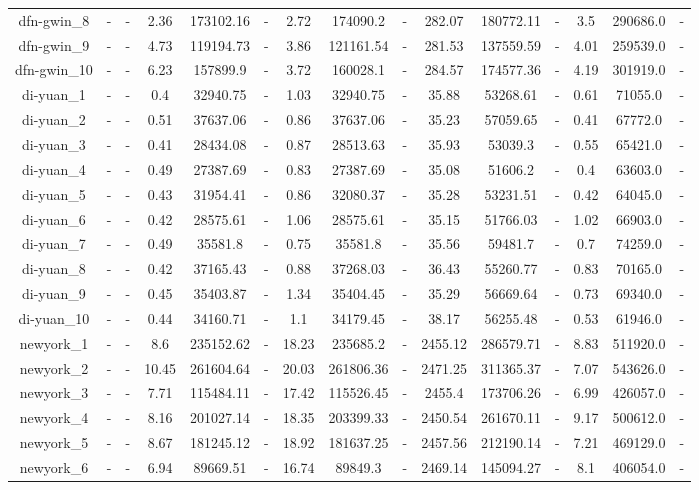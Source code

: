 \documentclass[main.tex]{subfiles}
\begin{document}
\begin{landscape}
\begin{table}[h]
\begin{tabular}{c|cc|ccc|ccc|ccc|ccc}
	\hline
	dfn-gwin\_8 &- &- &2.36 &173102.16 &- &2.72 &174090.2 &- &282.07 &180772.11 &- &3.5 &290686.0 &-\\
	dfn-gwin\_9 &- &- &4.73 &119194.73 &- &3.86 &121161.54 &- &281.53 &137559.59 &- &4.01 &259539.0 &-\\
	dfn-gwin\_10 &- &- &6.23 &157899.9 &- &3.72 &160028.1 &- &284.57 &174577.36 &- &4.19 &301919.0 &-\\
	di-yuan\_1 &- &- &0.4 &32940.75 &- &1.03 &32940.75 &- &35.88 &53268.61 &- &0.61 &71055.0 &-\\
	di-yuan\_2 &- &- &0.51 &37637.06 &- &0.86 &37637.06 &- &35.23 &57059.65 &- &0.41 &67772.0 &-\\
	di-yuan\_3 &- &- &0.41 &28434.08 &- &0.87 &28513.63 &- &35.93 &53039.3 &- &0.55 &65421.0 &-\\
	di-yuan\_4 &- &- &0.49 &27387.69 &- &0.83 &27387.69 &- &35.08 &51606.2 &- &0.4 &63603.0 &-\\
	di-yuan\_5 &- &- &0.43 &31954.41 &- &0.86 &32080.37 &- &35.28 &53231.51 &- &0.42 &64045.0 &-\\
	di-yuan\_6 &- &- &0.42 &28575.61 &- &1.06 &28575.61 &- &35.15 &51766.03 &- &1.02 &66903.0 &-\\
	di-yuan\_7 &- &- &0.49 &35581.8 &- &0.75 &35581.8 &- &35.56 &59481.7 &- &0.7 &74259.0 &-\\
	di-yuan\_8 &- &- &0.42 &37165.43 &- &0.88 &37268.03 &- &36.43 &55260.77 &- &0.83 &70165.0 &-\\
	di-yuan\_9 &- &- &0.45 &35403.87 &- &1.34 &35404.45 &- &35.29 &56669.64 &- &0.73 &69340.0 &-\\
	di-yuan\_10 &- &- &0.44 &34160.71 &- &1.1 &34179.45 &- &38.17 &56255.48 &- &0.53 &61946.0 &-\\
	newyork\_1 &- &- &8.6 &235152.62 &- &18.23 &235685.2 &- &2455.12 &286579.71 &- &8.83 &511920.0 &-\\
	newyork\_2 &- &- &10.45 &261604.64 &- &20.03 &261806.36 &- &2471.25 &311365.37 &- &7.07 &543626.0 &-\\
	newyork\_3 &- &- &7.71 &115484.11 &- &17.42 &115526.45 &- &2455.4 &173706.26 &- &6.99 &426057.0 &-\\
	newyork\_4 &- &- &8.16 &201027.14 &- &18.35 &203399.33 &- &2450.54 &261670.11 &- &9.17 &500612.0 &-\\
	newyork\_5 &- &- &8.67 &181245.12 &- &18.92 &181637.25 &- &2457.56 &212190.14 &- &7.21 &469129.0 &-\\
	newyork\_6 &- &- &6.94 &89669.51 &- &16.74 &89849.3 &- &2469.14 &145094.27 &- &8.1 &406054.0 &-\\

\end{tabular}
\end{table}
\end{landscape}
\end{document}
